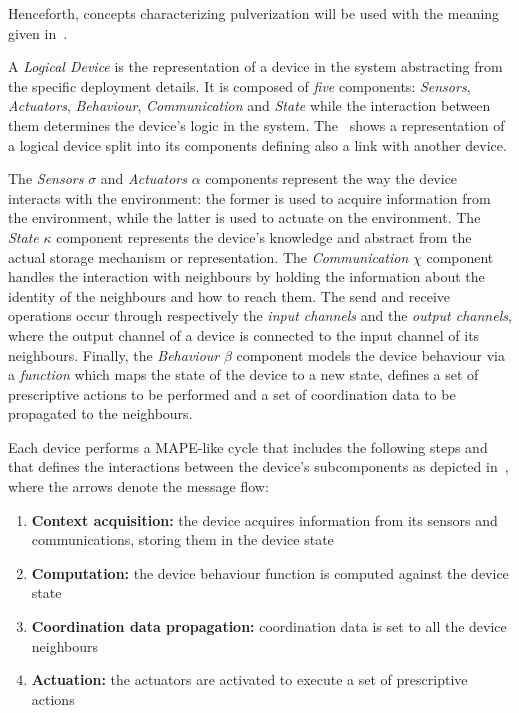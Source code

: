 Henceforth, concepts characterizing pulverization will be used with the meaning given in~.

A \emph{Logical Device} is the representation of a device in the system abstracting from the specific deployment details.
It is composed of \emph{five} components: \emph{Sensors}, \emph{Actuators}, \emph{Behaviour}, \emph{Communication} and \emph{State} while the
interaction between them determines the device's logic in the system. The~ shows a representation of a logical device
split into its components defining also a link with another device.

The \emph{Sensors} $\sigma$ and \emph{Actuators} $\alpha$ components represent the way the device interacts with the environment: the former is used
to acquire information from the environment, while the latter is used to actuate on the environment.
The \emph{State} $\kappa$ component represents the device's knowledge and abstract from the actual storage mechanism or representation.
The \emph{Communication} $\chi$ component handles the interaction with neighbours by holding the information about the identity of the neighbours and
how to reach them. The send and receive operations occur through respectively the \emph{input channels} and the \emph{output channels}, where the
output channel of a device is connected to the input channel of its neighbours.
Finally, the \emph{Behaviour} $\beta$ component models the device behaviour via a \emph{function} which maps the state of the device to a new state,
defines a set of prescriptive actions to be performed and a set of coordination data to be propagated to the neighbours.

Each device performs a MAPE-like cycle that includes the following steps and that defines the interactions between the device's subcomponents as
depicted in~, where the arrows denote the message flow:

\begin{enumerate}
	\item \textbf{Context acquisition:} the device acquires information from its sensors and communications, storing them in the device state
	\item \textbf{Computation:} the device behaviour function is computed against the device state
	\item \textbf{Coordination data propagation:} coordination data is set to all the device neighbours
	\item \textbf{Actuation:} the actuators are activated to execute a set of prescriptive actions
\end{enumerate}

